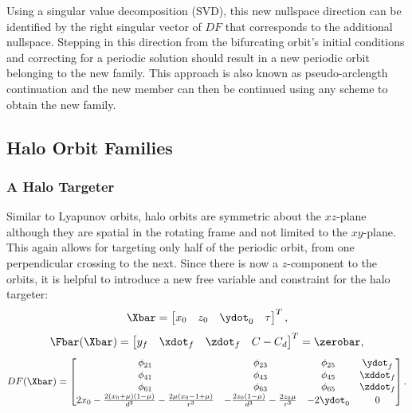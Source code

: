 Using a singular value decomposition (SVD), this new nullspace direction can be identified by the
right singular vector of $DF$ that corresponds to the additional nullspace. Stepping in this
direction from the bifurcating orbit's initial conditions and correcting for a periodic solution
should result in a new periodic orbit belonging to the new family. This approach is also known as
pseudo-arclength continuation and the new member can then be continued using any scheme to obtain
the new family.

\subsection{Halo Orbit Families}
\subsubsection{A Halo Targeter}
Similar to Lyapunov orbits, halo orbits are symmetric about the $xz$-plane although they are
spatial in the rotating frame and not limited to the $xy$-plane. This again allows for
targeting only half of the periodic orbit, from one perpendicular crossing to the next. Since there
is now a $z$-component to the orbits, it is helpful to introduce a new free variable and constraint
for the halo targeter:
\begin{equation}
    \Xbar=\begin{bmatrix}   x_{0}   &   z_{0}   &   \ydot_{0}   &   \tau    \end{bmatrix}^{T},
    \label{eq:halofreevar}
\end{equation}
\begin{equation}
    \Fbar(\Xbar)=\begin{bmatrix}    y_{f}   &   \xdot_{f}   &   \zdot_{f}   &   C-C_{d} \end{bmatrix}^{T}=\zerobar,
    \label{eq:haloconst}
\end{equation}
\begin{equation}
    DF(\Xbar)=\begin{bmatrix}   \phi_{21}                                                                   &   \phi_{23}                                               &   \phi_{25}                                   &   \ydot_{f}                               \\
                                \phi_{41}                                                                   &   \phi_{43}                                               &   \phi_{45}                                   &   \xddot_{f}                              \\
                                \phi_{61}                                                                   &   \phi_{63}                                               &   \phi_{65}                                   &   \zddot_{f}                              \\
                                2x_{0}-\frac{2(x_{0}+\mu)(1-\mu)}{d^{3}}-\frac{2\mu(x_{0}-1+\mu)}{r^{3}}    &   -\frac{2z_{0}(1-\mu)}{d^{3}}-\frac{2z_{0}\mu}{r^{3}}    &   -2\ydot_{0}                                 &   0                                       \end{bmatrix}.
    \label{eq:halojacobian}
\end{equation}
